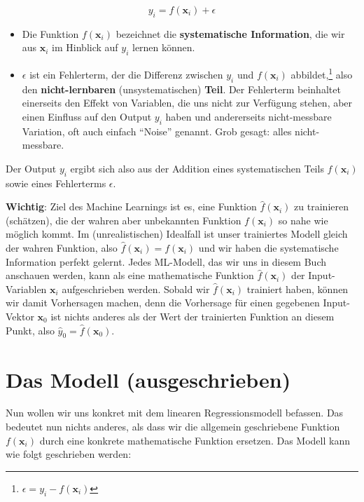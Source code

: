 \documentclass[
]{book}
\providecommand{\tightlist}{%
  \setlength{\itemsep}{0pt}\setlength{\parskip}{0pt}}
\begin{document}
\[
y_i = f(\mathbf{x}_i) + \epsilon
\]

\begin{itemize}
\tightlist
\item
  Die Funktion \(f(\mathbf{x}_i)\) bezeichnet die \textbf{systematische Information}, die wir aus \(\mathbf{x}_i\) im Hinblick auf \(y_i\) lernen können.
\item
  \(\epsilon\) ist ein Fehlerterm, der die Differenz zwischen \(y_i\) und \(f(\mathbf{x}_i)\) abbildet,\footnote{\(\epsilon = y_i - f(\mathbf{x}_i)\)} also den \textbf{nicht-lernbaren} (unsystematischen) \textbf{Teil}. Der Fehlerterm beinhaltet einerseits den Effekt von Variablen, die uns nicht zur Verfügung stehen, aber einen Einfluss auf den Output \(y_i\) haben und andererseits nicht-messbare Variation, oft auch einfach ``Noise'' genannt. Grob gesagt: alles nicht-messbare.
\end{itemize}

Der Output \(y_i\) ergibt sich also aus der Addition eines systematischen Teils \(f(\mathbf{x}_i)\) sowie eines Fehlerterms \(\epsilon\).

\textbf{Wichtig}: Ziel des Machine Learnings ist es, eine Funktion \(\hat{f}(\mathbf{x}_i)\) zu trainieren (schätzen), die der wahren aber unbekannten Funktion \(f(\mathbf{x}_i)\) so nahe wie möglich kommt. Im (unrealistischen) Idealfall ist unser trainiertes Modell gleich der wahren Funktion, also \(\hat{f}(\mathbf{x}_i) = f(\mathbf{x}_i)\) und wir haben die systematische Information perfekt gelernt. Jedes ML-Modell, das wir uns in diesem Buch anschauen werden, kann als eine mathematische Funktion \(\hat{f}(\mathbf{x}_i)\) der Input-Variablen \(\mathbf{x}_i\) aufgeschrieben werden. Sobald wir \(\hat{f}(\mathbf{x}_i)\) trainiert haben, können wir damit Vorhersagen machen, denn die Vorhersage für einen gegebenen Input-Vektor \(\mathbf{x}_0\) ist nichts anderes als der Wert der trainierten Funktion an diesem Punkt, also \(\hat{y}_0 = \hat{f}(\mathbf{x}_0)\).

\hypertarget{das-modell-ausgeschrieben}{%
\section{Das Modell (ausgeschrieben)}\label{das-modell-ausgeschrieben}}

Nun wollen wir uns konkret mit dem linearen Regressionsmodell befassen. Das bedeutet nun nichts anderes, als dass wir die allgemein geschriebene Funktion \(f(\mathbf{x}_i)\) durch eine konkrete mathematische Funktion ersetzen. Das Modell kann wie folgt geschrieben werden:
\end{document}
